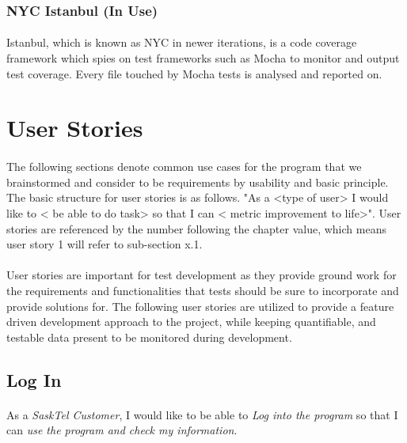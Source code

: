 \documentclass[12pt]{article}
\begin{document}
\subsubsection{NYC Istanbul (In Use)}
\paragraph{}	Istanbul, which is known as NYC in newer iterations, is a code coverage framework which spies on test frameworks such as Mocha to monitor and output test coverage. Every file touched by Mocha tests is analysed and reported on. 
\newpage

\section{User Stories}
\paragraph{}	The following sections denote common use cases for the program that we brainstormed and consider to be requirements by usability and basic principle. The basic structure for user stories is as follows. "As a <type of user> I would like to < be able to do task> so that I can < metric improvement to life>". User stories are referenced by the number following the chapter value, which means user story 1 will refer to sub-section x.1.

\paragraph{}	User stories are important for test development as they provide ground work for the requirements and functionalities that tests should be sure to incorporate and provide solutions for. The following user stories are utilized to provide a feature driven development approach to the project, while keeping quantifiable, and testable data present to be monitored during development. 

\subsection{Log In}
\paragraph{}	As a \textit{SaskTel Customer}, I would like to be able to \textit{Log into the program} so that I can \textit{use the program and check my information}.
\end{document}
